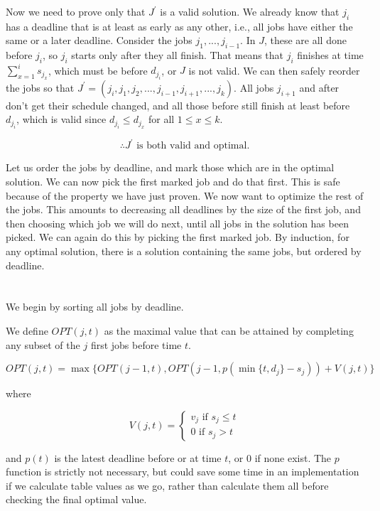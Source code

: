 \documentclass{article}
\begin{document}
Now we need to prove only that $J^\prime$ is a valid solution. We already know that $j_i$ has a deadline that is at least as early as any other, i.e., all jobs have either the same or a later deadline. Consider the jobs $j_1, ..., j_{i-1}$. In $J$, these are all done before $j_i$, so $j_i$ starts only after they all finish. That means that $j_i$ finishes at time $\sum_{x=1}^i s_{j_x}$, which must be before $d_{j_i}$, or $J$ is not valid. We can then safely reorder the jobs so that $J^\prime = (j_i, j_1, j_2, ..., j_{i-1}, j_{i+1}, ..., j_k)$. All jobs $j_{i+1}$ and after don't get their schedule changed, and all those before still finish at least before $d_{j_i}$, which is valid since $d_{j_i} \leq d_{j_x}$ for all $1 \leq x \leq k$.

$$\therefore J^\prime \text{ is both valid and optimal.}$$

Let us order the jobs by deadline, and mark those which are in the optimal solution. We can now pick the first marked job and do that first. This is safe because of the property we have just proven. We now want to optimize the rest of the jobs. This amounts to decreasing all deadlines by the size of the first job, and then choosing which job we will do next, until all jobs in the solution has been picked. We can again do this by picking the first marked job. By induction, for any optimal solution, there is a solution containing the same jobs, but ordered by deadline.

\section{}

We begin by sorting all jobs by deadline.

We define $OPT(j, t)$ as the maximal value that can be attained by completing any subset of the $j$ first jobs before time $t$.

$$OPT(j, t) = \max\{OPT(j-1, t), OPT(j-1, p(\min\{t, d_j \} - s_j)) + V(j,t)\}$$

where

\[
    V(j, t) = 
    \begin{cases} 
        v_j \text{ if } s_j \leq t\\
        0 \text{ if } s_j > t
    \end{cases}
\]

and $p(t)$ is the latest deadline before or at time $t$, or 0 if none exist. The $p$ function is strictly not necessary, but could save some time in an implementation if we calculate table values as we go, rather than calculate them all before checking the final optimal value.
\end{document}
